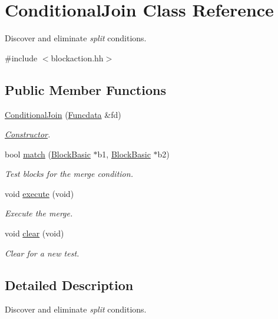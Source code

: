 \hypertarget{class_conditional_join}{}\section{Conditional\+Join Class Reference}
\label{class_conditional_join}


Discover and eliminate {\itshape split} conditions.  




{\ttfamily \#include $<$blockaction.\+hh$>$}

\subsection*{Public Member Functions}
\begin{DoxyCompactItemize}
\item 
\mbox{\hyperlink{class_conditional_join_a92106a1507dac5ae066ab3acec324eb2}{Conditional\+Join}} (\mbox{\hyperlink{class_funcdata}{Funcdata}} \&fd)
\begin{DoxyCompactList}\small\item\em \mbox{\hyperlink{class_constructor}{Constructor}}. \end{DoxyCompactList}\item 
bool \mbox{\hyperlink{class_conditional_join_ab4f86556c6387f177e341329ed346e99}{match}} (\mbox{\hyperlink{class_block_basic}{Block\+Basic}} $\ast$b1, \mbox{\hyperlink{class_block_basic}{Block\+Basic}} $\ast$b2)
\begin{DoxyCompactList}\small\item\em Test blocks for the merge condition. \end{DoxyCompactList}\item 
void \mbox{\hyperlink{class_conditional_join_a7ddeb5ef416cda6bec2ca424b22e00a7}{execute}} (void)
\begin{DoxyCompactList}\small\item\em Execute the merge. \end{DoxyCompactList}\item 
void \mbox{\hyperlink{class_conditional_join_a9e69ebb78367803c598edfdc5ef04f5a}{clear}} (void)
\begin{DoxyCompactList}\small\item\em Clear for a new test. \end{DoxyCompactList}\end{DoxyCompactItemize}


\subsection{Detailed Description}
Discover and eliminate {\itshape split} conditions. 

